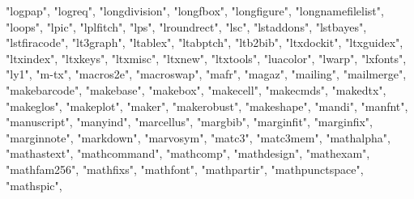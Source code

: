 \documentclass[
]{article}
\newenvironment{Shaded}{\begin{snugshade}}{\end{snugshade}}
\newcommand{\NormalTok}[1]{#1}
\newcommand{\StringTok}[1]{\textcolor[rgb]{0.31,0.60,0.02}{#1}}
\begin{document}
\begin{Shaded}
\begin{Highlighting}[]
\StringTok{"logpap"}\NormalTok{, }\StringTok{"logreq"}\NormalTok{, }\StringTok{"longdivision"}\NormalTok{, }\StringTok{"longfbox"}\NormalTok{, }\StringTok{"longfigure"}\NormalTok{, }
\StringTok{"longnamefilelist"}\NormalTok{, }\StringTok{"loops"}\NormalTok{, }\StringTok{"lpic"}\NormalTok{, }\StringTok{"lplfitch"}\NormalTok{, }\StringTok{"lps"}\NormalTok{, }\StringTok{"lroundrect"}\NormalTok{, }
\StringTok{"lsc"}\NormalTok{, }\StringTok{"lstaddons"}\NormalTok{, }\StringTok{"lstbayes"}\NormalTok{, }\StringTok{"lstfiracode"}\NormalTok{, }\StringTok{"lt3graph"}\NormalTok{, }\StringTok{"ltablex"}\NormalTok{, }
\StringTok{"ltabptch"}\NormalTok{, }\StringTok{"ltb2bib"}\NormalTok{, }\StringTok{"ltxdockit"}\NormalTok{, }\StringTok{"ltxguidex"}\NormalTok{, }\StringTok{"ltxindex"}\NormalTok{, }
\StringTok{"ltxkeys"}\NormalTok{, }\StringTok{"ltxmisc"}\NormalTok{, }\StringTok{"ltxnew"}\NormalTok{, }\StringTok{"ltxtools"}\NormalTok{, }\StringTok{"luacolor"}\NormalTok{, }\StringTok{"lwarp"}\NormalTok{, }
\StringTok{"lxfonts"}\NormalTok{, }\StringTok{"ly1"}\NormalTok{, }\StringTok{"m{-}tx"}\NormalTok{, }\StringTok{"macros2e"}\NormalTok{, }\StringTok{"macroswap"}\NormalTok{, }\StringTok{"mafr"}\NormalTok{, }\StringTok{"magaz"}\NormalTok{, }
\StringTok{"mailing"}\NormalTok{, }\StringTok{"mailmerge"}\NormalTok{, }\StringTok{"makebarcode"}\NormalTok{, }\StringTok{"makebase"}\NormalTok{, }\StringTok{"makebox"}\NormalTok{, }
\StringTok{"makecell"}\NormalTok{, }\StringTok{"makecmds"}\NormalTok{, }\StringTok{"makedtx"}\NormalTok{, }\StringTok{"makeglos"}\NormalTok{, }\StringTok{"makeplot"}\NormalTok{, }\StringTok{"maker"}\NormalTok{, }
\StringTok{"makerobust"}\NormalTok{, }\StringTok{"makeshape"}\NormalTok{, }\StringTok{"mandi"}\NormalTok{, }\StringTok{"manfnt"}\NormalTok{, }\StringTok{"manuscript"}\NormalTok{, }\StringTok{"manyind"}\NormalTok{, }
\StringTok{"marcellus"}\NormalTok{, }\StringTok{"margbib"}\NormalTok{, }\StringTok{"marginfit"}\NormalTok{, }\StringTok{"marginfix"}\NormalTok{, }\StringTok{"marginnote"}\NormalTok{, }
\StringTok{"markdown"}\NormalTok{, }\StringTok{"marvosym"}\NormalTok{, }\StringTok{"matc3"}\NormalTok{, }\StringTok{"matc3mem"}\NormalTok{, }\StringTok{"mathalpha"}\NormalTok{, }\StringTok{"mathastext"}\NormalTok{, }
\StringTok{"mathcommand"}\NormalTok{, }\StringTok{"mathcomp"}\NormalTok{, }\StringTok{"mathdesign"}\NormalTok{, }\StringTok{"mathexam"}\NormalTok{, }\StringTok{"mathfam256"}\NormalTok{, }
\StringTok{"mathfixs"}\NormalTok{, }\StringTok{"mathfont"}\NormalTok{, }\StringTok{"mathpartir"}\NormalTok{, }\StringTok{"mathpunctspace"}\NormalTok{, }\StringTok{"mathspic"}\NormalTok{, }

\end{Highlighting}
\end{Shaded}
\end{document}

